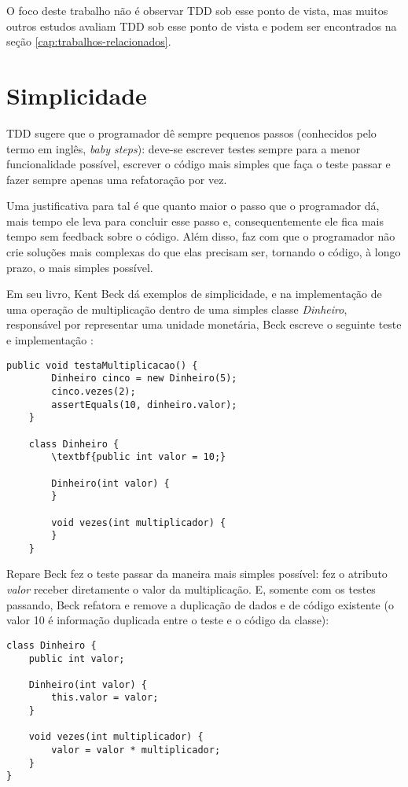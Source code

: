 O foco deste trabalho não é observar TDD sob esse ponto de vista, mas muitos
outros estudos avaliam TDD sob esse ponto de vista e podem ser encontrados na
seção \ref{cap:trabalhos-relacionados}.

\section{Simplicidade}

TDD sugere que o programador dê sempre pequenos passos (conhecidos pelo termo em
inglês, \textit{baby steps}): deve-se escrever testes sempre para a menor
funcionalidade possível, escrever o código mais simples que faça o teste passar
e fazer sempre apenas uma refatoração por vez.

Uma justificativa para tal é que quanto maior o passo que o programador dá, mais
tempo ele leva para concluir esse passo e, consequentemente ele fica mais tempo
sem feedback sobre o código. Além disso, faz com que o programador não crie
soluções mais complexas do que elas precisam ser, tornando o código, à longo
prazo, o mais simples possível.

Em seu livro, Kent Beck dá exemplos de simplicidade, e na implementação de uma
operação de multiplicação dentro de uma simples classe \textit{Dinheiro},
responsável por representar uma unidade monetária, Beck escreve o seguinte
teste e implementação \cite{TDDByExample}:

\begin{lstlisting}[frame=trbl]
    public void testaMultiplicacao() {
		Dinheiro cinco = new Dinheiro(5);
		cinco.vezes(2);
		assertEquals(10, dinheiro.valor);
	}
	
	class Dinheiro {
		\textbf{public int valor = 10;}
		
		Dinheiro(int valor) {
		}
		
		void vezes(int multiplicador) {
		}
	}

\end{lstlisting}

Repare Beck fez o teste passar da maneira mais simples possível: fez o atributo
\textit{valor} receber diretamente o valor da multiplicação. E, somente com os
testes passando, Beck refatora e remove a duplicação de dados e de código
existente (o valor 10 é informação duplicada entre o teste e o código da
classe):

\begin{lstlisting}[frame=trbl]
class Dinheiro {
	public int valor;
	
	Dinheiro(int valor) {
		this.valor = valor;
	}
	
	void vezes(int multiplicador) {
		valor = valor * multiplicador;
	}
}
\end{lstlisting}

